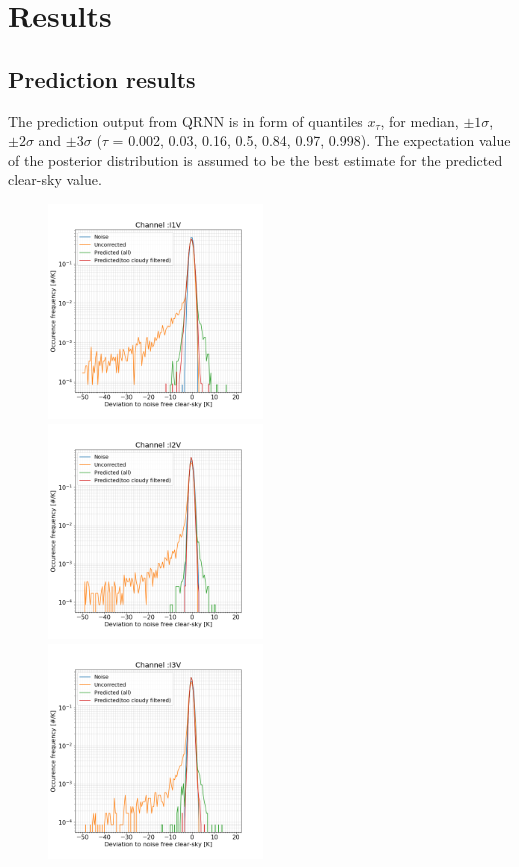 \documentclass[amt, manuscript]{copernicus}
\begin{document}
\section{Results}
\subsection{Prediction results}

The prediction output from QRNN is in form of quantiles $x_{\tau}$, for median, $\pm 1\sigma$, $\pm 2 \sigma$ and  $\pm 3 \sigma$ ($\tau$ = 0.002, 0.03, 0.16, 0.5, 0.84, 0.97, 0.998). The expectation value of the posterior distribution is assumed to be the best estimate for the predicted clear-sky value.  

\begin{figure}[p]
	\centering
	\includegraphics[height=57mm]{Figures/ICI_I1V.png} 
	\includegraphics[height=57mm]{Figures/ICI_I2V.png}
	\includegraphics[height=57mm]{Figures/ICI_I3V.png} 
	\caption{}
	\label{fig:}	
\end{figure}
\end{document}
